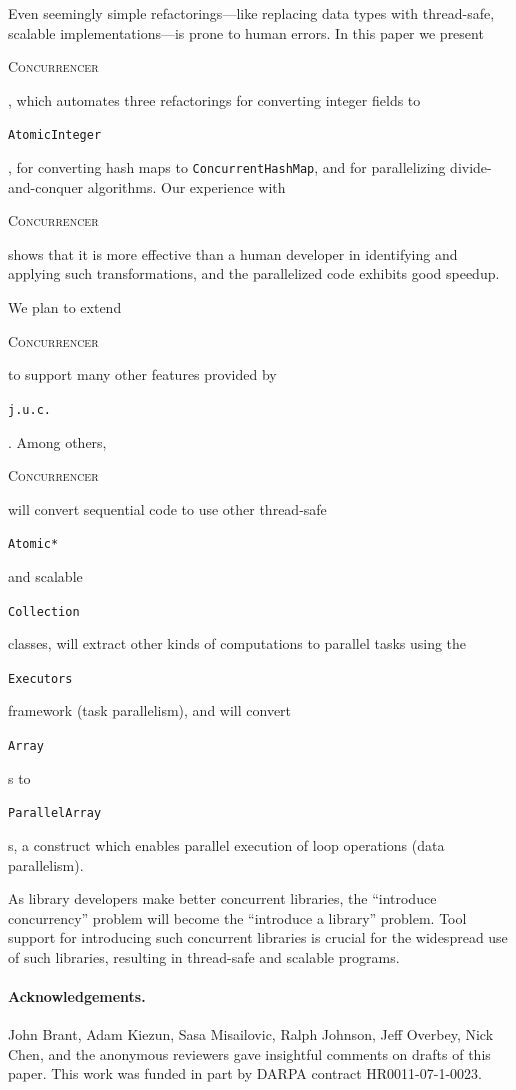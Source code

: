 \documentclass[10pt,twocolumn]{article}
\newcommand{\tool}{\begin{scriptsize}\textsc{Concurrencer}\end{scriptsize}\xspace}
\newcommand{\code}[1]{\begin{smaller}\texttt{#1}\end{smaller}}
\newcommand{\codex}[1]{{\smaller\texttt{#1}}\xspace}
\newcommand{\ConcurrentHashMap}{\codex{Con\-cur\-rent\-Hash\-Map}}
\begin{document}
Even seemingly simple refactorings---like replacing data types with thread-safe,
scalable implementations---is prone to human errors.
In this paper we present \tool, which automates three refactorings for converting integer fields to
\code{AtomicInteger}, for converting hash maps to \ConcurrentHashMap, and for
parallelizing divide-and-conquer algorithms. Our experience with \tool shows
that it is more effective than a human developer in identifying and applying
such transformations, and the parallelized code exhibits good speedup. 
 
We plan to extend \tool to support many other features provided by
\code{j.u.c.}. Among others, \tool will convert sequential code to use other
thread-safe \code{Atomic*} and scalable \code{Collection} classes, will extract
other kinds of computations to parallel tasks using the \code{Executors}
framework (task parallelism), and will convert \code{Array}s to
\code{ParallelArray}s, a construct which enables parallel execution of loop
operations (data parallelism).

As library developers make better concurrent libraries, the ``introduce
concurrency'' problem will become the ``introduce a library'' problem.
Tool support for introducing such concurrent libraries is crucial for the
widespread use of such libraries, resulting in thread-safe and scalable
programs.



\paragraph{Acknowledgements.} John Brant, Adam Kiezun, Sasa Misailovic,
Ralph Johnson, Jeff Overbey, Nick Chen, and the anonymous reviewers gave
insightful comments on drafts of this paper.   This work was funded in part
by DARPA contract HR0011-07-1-0023.
\end{document}
